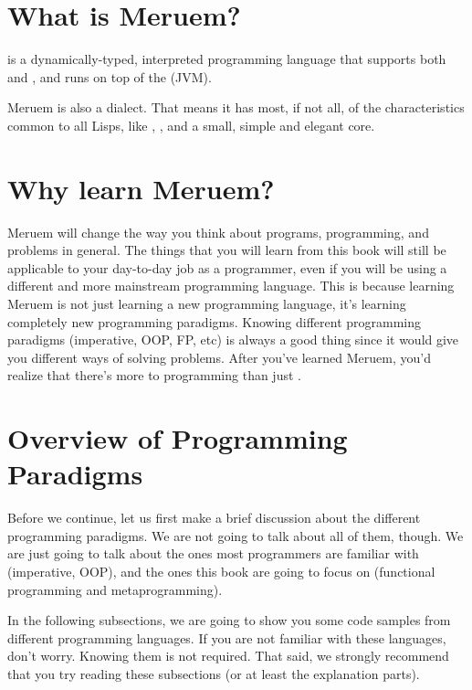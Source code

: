 \section{What is Meruem?}
 is a dynamically-typed, interpreted programming language that supports both  and , and runs on top of the (JVM).

Meruem is also a  dialect. That means it has most, if not all, of the characteristics common to all Lisps, like , , and a small, simple and elegant core.

\section{Why learn Meruem?}
Meruem will change the way you think about programs, programming, and problems in general. The things that you will learn from this book will still be applicable to your day-to-day job as a programmer, even if you will be using a different and more mainstream programming language. This is because learning Meruem is not just learning a new programming language, it's learning completely new programming paradigms. Knowing different programming paradigms (imperative, OOP, FP, etc) is always a good thing since it would give you different ways of solving problems. After you've learned Meruem, you'd realize that there's more to programming than just .

\section{Overview of Programming Paradigms}
Before we continue, let us first make a brief discussion about the different programming paradigms. We are not going to talk about all of them, though. We are just going to talk about the ones most programmers are familiar with (imperative, OOP), and the ones this book are going to focus on (functional programming and metaprogramming).

In the following subsections, we are going to show you some code samples from different programming languages. If you are not familiar with these languages, don't worry. Knowing them is not required. That said, we strongly recommend that you try reading these subsections (or at least the explanation parts).

